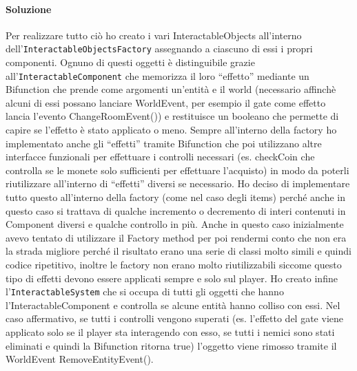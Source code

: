 \documentclass[a4paper,12pt]{report}
\begin{document}
\paragraph*{Soluzione}
	Per realizzare tutto ciò ho creato i vari InteractableObjects all'interno dell'\texttt{InteractableObjectsFactory} assegnando a ciascuno di essi i propri componenti. Ognuno di questi oggetti è distinguibile grazie all'\texttt{InteractableComponent} che memorizza il loro “effetto” mediante un Bifunction che prende come argomenti un'entità e il world (necessario affinchè alcuni di essi possano lanciare WorldEvent, per esempio il gate come effetto lancia l'evento ChangeRoomEvent()) e restituisce un booleano che permette di capire se l'effetto è stato applicato o meno.
	Sempre all'interno della factory ho implementato anche gli “effetti” tramite Bifunction che poi utilizzano altre interfacce funzionali per effettuare i controlli necessari (es. checkCoin che controlla se le monete solo sufficienti per effettuare l'acquisto) in modo da poterli riutilizzare all'interno di “effetti” diversi se necessario. Ho deciso di implementare tutto questo all'interno della factory (come nel caso degli items) perché anche in questo caso si trattava di qualche incremento o decremento di interi contenuti in Component diversi e qualche controllo in più. Anche in questo caso inizialmente avevo tentato di utilizzare il Factory method per poi rendermi conto che non era la strada migliore perché il risultato erano una serie di classi molto simili e quindi codice ripetitivo, inoltre le factory non erano molto riutilizzabili siccome questo tipo di effetti devono essere applicati sempre e solo sul player.
	Ho creato infine l'\texttt{InteractableSystem} che si occupa di tutti gli oggetti che hanno l'InteractableComponent e controlla se alcune entità hanno colliso con essi. Nel caso affermativo, se tutti i controlli vengono superati (es. l'effetto del gate viene applicato solo se il player sta interagendo con esso, se tutti i nemici sono stati eliminati e quindi la Bifunction ritorna true) l'oggetto viene rimosso tramite il WorldEvent RemoveEntityEvent(). 
	
\end{document}
